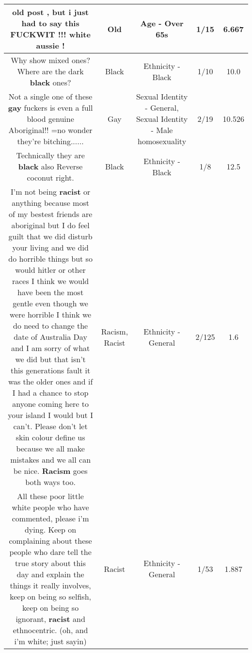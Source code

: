 \documentclass[11pt]{article}
\newlength\mylength
\begin{document}
\begin{center}
\begin{longtable}{|C{.65\mylength}|C{.30\mylength}|C{.12\mylength}|C{.12\mylength}|C{.12\mylength}|}
  \small old post , but i just had to say this FUCKWIT !!!  white aussie !\normalsize   & Old & Age - Over 65s & 1/15 & 6.667 \\  \hline
  \small Why show mixed ones? Where are the dark \textbf{black} ones?\normalsize   & Black & Ethnicity - Black & 1/10 & 10.0 \\  \hline
  \small Not a single one of these \textbf{g\textbf{ay}} fuckers is even a full blood genuine Aboriginal!!   =no wonder they're bitching......\normalsize   & Gay & Sexual Identity - General, Sexual Identity - Male homosexuality & 2/19 & 10.526 \\  \hline
  \small Technically they are \textbf{black} also Reverse coconut right.\normalsize   & Black & Ethnicity - Black & 1/8 & 12.5 \\  \hline
  \small I'm not being \textbf{racist} or anything because most of my bestest friends are aboriginal but I do feel guilt that we did disturb your living and we did do horrible things but so would hitler or other races I think we would have been the most gentle even though we were horrible I think we do need to change the date of Australia Day and I am sorry of what we did but that isn't this generations fault it was the older ones and if I had a chance to stop anyone coming here to your island I would but I can't. Please don't let skin colour define us because we all make mistakes and we all can be nice. \textbf{Racism} goes both ways too.\normalsize   & Racism, Racist & Ethnicity - General & 2/125 & 1.6 \\  \hline
  \small All these poor little white people who have commented, please i'm dying. Keep on complaining about these people who dare tell the true story about this day and explain the things it really involves, keep on being so selfish, keep on being so ignorant, \textbf{racist} and ethnocentric. (oh, and i'm white; just sayin)\normalsize   & Racist & Ethnicity - General & 1/53 & 1.887 \\  \hline

\end{longtable}
\end{center}
\end{document}
